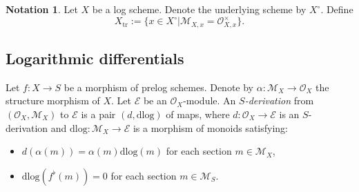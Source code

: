 \documentclass{amsart}
\def\gp{\textrm{gp}}
\theoremstyle{definition}
\newtheorem{proposition}[theorem]{Proposition}
\newtheorem{corollary}[theorem]{Corollary}
\newtheorem{notation}[theorem]{Notation}
\newcommand\dlog{\mathrm{dlog}}
\newcommand{\mO}{\mathcal{O}}
\newcommand{\mM}{\mathcal{M}}
\newcommand{\Hom}{\textrm{Hom}}
\numberwithin{equation}{section}
\begin{document}



\begin{notation}
	Let $X$ be a log scheme. Denote the underlying scheme by $X^\circ$. Define
	\[
	X_{\textrm{tr}}:= \{x\in X^\circ| \mM_{X,x}= \mO_{X,x}^\times\}.
	\]
\end{notation}


\subsection{Logarithmic differentials}
Let $f:X\to S$ be a morphism of prelog schemes. Denote by $\alpha:\mathcal{M}_X\to \mathcal{O}_X$ the structure morphism of $X$. Let $\mathcal{E}$ be an $\mathcal{O}_X$-module. An \textit{$S$-derivation} from $(\mathcal{O}_X,\mM_X)$ to $\mathcal{E}$ is a pair $(d,\dlog)$ of maps, where $d:\mathcal{O}_X\to \mathcal{E}$ is an $S$-derivation and $\dlog:\mathcal{M}_X\to \mathcal{E}$ is a morphism of monoids satisfying:
\begin{itemize}
	\item $d(\alpha(m))=\alpha(m)\dlog(m)$ for each section $m\in \mathcal{M}_X$,
	\item $\dlog(f^\flat(m))=0$ for each section $m\in \mathcal{M}_S$.
\end{itemize}
\end{document}
